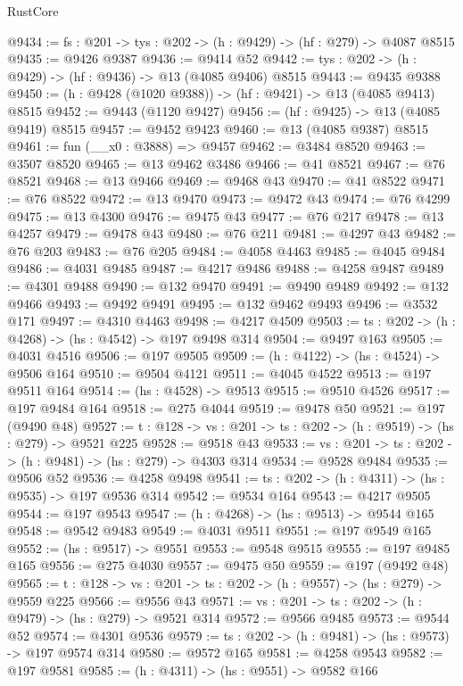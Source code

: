\begin{lexlean}{RustCore}
\begin{coremodule}
@9434 := {fs : @201} -> {tys : @202} -> (h : @9429) -> (hf : @279) -> @4087 @8515
@9435 := @9426 @9387
@9436 := @9414 @52
@9442 := {tys : @202} -> (h : @9429) -> (hf : @9436) -> @13 (@4085 @9406) @8515
@9443 := @9435 @9388
@9450 := (h : @9428 (@1020 @9388)) -> (hf : @9421) -> @13 (@4085 @9413) @8515
@9452 := @9443 (@1120 @9427)
@9456 := (hf : @9425) -> @13 (@4085 @9419) @8515
@9457 := @9452 @9423
@9460 := @13 (@4085 @9387) @8515
@9461 := fun (__x0 : @3888) => @9457
@9462 := @3484 @8520
@9463 := @3507 @8520
@9465 := @13 @9462 @3486
@9466 := @41 @8521
@9467 := @76 @8521
@9468 := @13 @9466
@9469 := @9468 @43
@9470 := @41 @8522
@9471 := @76 @8522
@9472 := @13 @9470
@9473 := @9472 @43
@9474 := @76 @4299
@9475 := @13 @4300
@9476 := @9475 @43
@9477 := @76 @217
@9478 := @13 @4257
@9479 := @9478 @43
@9480 := @76 @211
@9481 := @4297 @43
@9482 := @76 @203
@9483 := @76 @205
@9484 := @4058 @4463
@9485 := @4045 @9484
@9486 := @4031 @9485
@9487 := @4217 @9486
@9488 := @4258 @9487
@9489 := @4301 @9488
@9490 := @132 @9470
@9491 := @9490 @9489
@9492 := @132 @9466
@9493 := @9492 @9491
@9495 := @132 @9462 @9493
@9496 := @3532 @171
@9497 := @4310 @4463
@9498 := @4217 @4509
@9503 := {ts : @202} -> (h : @4268) -> (hs : @4542) -> @197 @9498 @314
@9504 := @9497 @163
@9505 := @4031 @4516
@9506 := @197 @9505
@9509 := (h : @4122) -> (hs : @4524) -> @9506 @164
@9510 := @9504 @4121
@9511 := @4045 @4522
@9513 := @197 @9511 @164
@9514 := (hs : @4528) -> @9513
@9515 := @9510 @4526
@9517 := @197 @9484 @164
@9518 := @275 @4044
@9519 := @9478 @50
@9521 := @197 (@9490 @48)
@9527 := {t : @128} -> {vs : @201} -> {ts : @202} -> (h : @9519) -> (hs : @279) -> @9521 @225
@9528 := @9518 @43
@9533 := {vs : @201} -> {ts : @202} -> (h : @9481) -> (hs : @279) -> @4303 @314
@9534 := @9528 @9484
@9535 := @9506 @52
@9536 := @4258 @9498
@9541 := {ts : @202} -> (h : @4311) -> (hs : @9535) -> @197 @9536 @314
@9542 := @9534 @164
@9543 := @4217 @9505
@9544 := @197 @9543
@9547 := (h : @4268) -> (hs : @9513) -> @9544 @165
@9548 := @9542 @9483
@9549 := @4031 @9511
@9551 := @197 @9549 @165
@9552 := (hs : @9517) -> @9551
@9553 := @9548 @9515
@9555 := @197 @9485 @165
@9556 := @275 @4030
@9557 := @9475 @50
@9559 := @197 (@9492 @48)
@9565 := {t : @128} -> {vs : @201} -> {ts : @202} -> (h : @9557) -> (hs : @279) -> @9559 @225
@9566 := @9556 @43
@9571 := {vs : @201} -> {ts : @202} -> (h : @9479) -> (hs : @279) -> @9521 @314
@9572 := @9566 @9485
@9573 := @9544 @52
@9574 := @4301 @9536
@9579 := {ts : @202} -> (h : @9481) -> (hs : @9573) -> @197 @9574 @314
@9580 := @9572 @165
@9581 := @4258 @9543
@9582 := @197 @9581
@9585 := (h : @4311) -> (hs : @9551) -> @9582 @166

\end{coremodule}
\end{lexlean}
